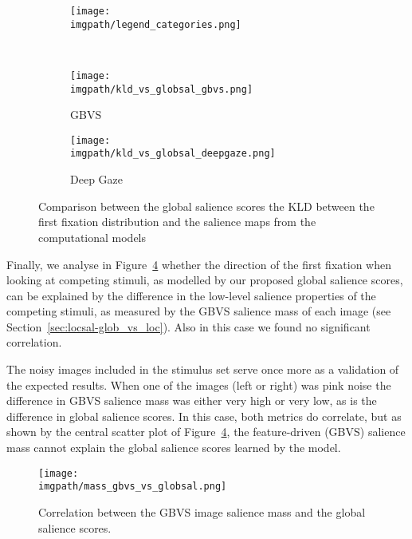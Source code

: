 {\begin{figure}[ht]
  \centering
  \begin{subfigure}{0.6 \linewidth}
      \texttt{[image: \\imgpath/legend\_categories.png]}
  \end{subfigure}
  \\
  \begin{subfigure}{0.48 \linewidth}
      \texttt{[image: \\imgpath/kld\_vs\_globsal\_gbvs.png]}
      \caption{GBVS}
    \label{fig:globsal-kld_vs_globsal_gbvs}
  \end{subfigure}
  \hspace{0.01 \linewidth}
  \begin{subfigure}{0.48 \linewidth}
      \texttt{[image: \\imgpath/kld\_vs\_globsal\_deepgaze.png]}
      \caption{Deep Gaze}
    \label{fig:globsal-kld_vs_globsal_deepgaze}
  \end{subfigure}
  \caption{Comparison between the global salience scores the KLD between the first fixation distribution and the salience maps from the computational models}
  \label{fig:globsal-kld_vs_globsal}
\end{figure}

Finally, we analyse in Figure~\ref{fig:globsal-mass_gbvs_vs_globsal} whether the direction of the first fixation when looking at competing stimuli, as modelled by our proposed global salience scores, can be explained by the difference in the low-level salience properties of the competing stimuli, as measured by the GBVS salience mass of each image (see Section~\ref{sec:locsal-glob_vs_loc}). Also in this case we found no significant correlation.

The noisy images included in the stimulus set serve once more as a validation of the expected results. When one of the images (left or right) was pink noise the difference in GBVS salience mass was either very high or very low, as is the difference in global salience scores. In this case, both metrics do correlate, but as shown by the central scatter plot of Figure~\ref{fig:globsal-mass_gbvs_vs_globsal}, the feature-driven (GBVS) salience mass cannot explain the global salience scores learned by the model.

\begin{figure}[ht]
  \centering
  \texttt{[image: \\imgpath/mass\_gbvs\_vs\_globsal.png]}
  \caption{Correlation between the GBVS image salience mass and the global salience scores.}
\label{fig:globsal-mass_gbvs_vs_globsal}
\end{figure}

}
